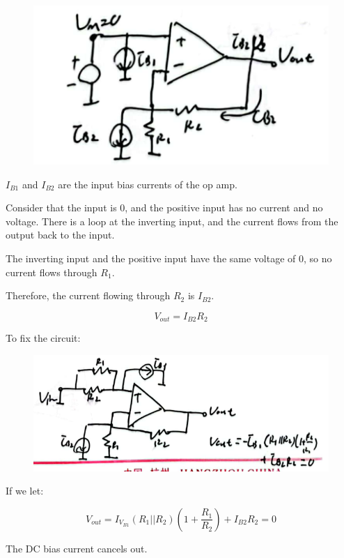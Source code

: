 \documentclass[fontset=windows]{article}
\begin{document}
\begin{figure}[htbp]
    \centering
    \includegraphics[scale=0.8]{13.jpg}
    \captionsetup{labelformat=empty}
    \caption{}
    \label{13}
\end{figure}

$I_{B1}$ and $I_{B2}$ are the input bias currents of the op amp. 

Consider that the input is 0, and the positive input has no current and no voltage. There is a loop at the inverting input, and the current flows from the output back to the input. 

The inverting input and the positive input have the same voltage of 0, so no current flows through $R_1$. 

Therefore, the current flowing through $R_2$ is $I_{B2}$. 

$$V_{out}=I_{B2}R_2$$

To fix the circuit: 

\begin{figure}[htbp]
    \centering
    \includegraphics[scale=0.6]{14.jpg}
    \captionsetup{labelformat=empty}
    \caption{}
    \label{14}
\end{figure}

If we let: 

$$V_{out}=I_{V_{B1}}(R_1||R_2)(1+\frac{R_1}{R_2})+I_{B2}R_2=0$$

The DC bias current cancels out. 
\end{document}
